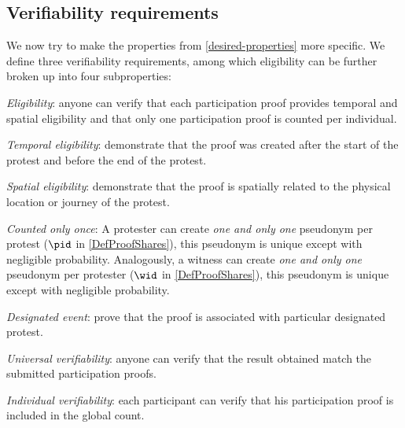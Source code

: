 \subsection{Verifiability requirements}%
\label{verifiability-properties}

We now try to make the properties from \cref{desired-properties} more 
specific.
We define three verifiability requirements, among which eligibility can be 
further broken up into four subproperties:
\begin{requirements}[V]
  \item\label{EligibilityVerif} \emph{Eligibility}: anyone can verify that each participation proof provides temporal and spatial eligibility and that only one participation proof is counted per individual.
    \begin{requirements}

    \item\label{TemporallyRelated} \emph{Temporal eligibility}: demonstrate that the proof was created after the start of the protest and before the end of the protest.

    \item\label{SpatiallyRelated} \emph{Spatial eligibility}: demonstrate that the proof is spatially related to the physical location or journey of the protest.

    \item\label{CountOnce} \emph{Counted only once}:
      A protester can create \emph{one and only one} pseudonym per protest 
      (\(\pid\) in \cref{DefProofShares}), this pseudonym is unique except with 
      negligible probability.
      Analogously, a witness can create \emph{one and only one} pseudonym per 
      protester (\(\wid\) in \cref{DefProofShares}), this pseudonym is unique 
      except with negligible probability.

    \item\label{DesignatedEvent} \emph{Designated event}: prove that the proof is associated with particular designated protest.

    \end{requirements}

  \item\label{UniversalVerif} \emph{Universal verifiability}: anyone can verify that the result obtained match the submitted participation proofs.

  \item\label{IndividualVerif} \emph{Individual verifiability}: each participant can verify that his participation proof is included in the global count.
\end{requirements}

